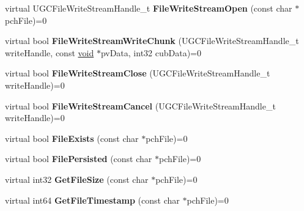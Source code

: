 \begin{DoxyCompactItemize}
\item 
\hypertarget{classISteamRemoteStorage_aa88184d6151848c3bfb2f2cc4edda106}{}virtual U\+G\+C\+File\+Write\+Stream\+Handle\+\_\+t {\bfseries File\+Write\+Stream\+Open} (const char $\ast$pch\+File)=0\label{classISteamRemoteStorage_aa88184d6151848c3bfb2f2cc4edda106}

\item 
\hypertarget{classISteamRemoteStorage_a6e4df6a98b25df3f53a138308d0ef4c8}{}virtual bool {\bfseries File\+Write\+Stream\+Write\+Chunk} (U\+G\+C\+File\+Write\+Stream\+Handle\+\_\+t write\+Handle, const \hyperlink{SDL__audio_8h_a52835ae37c4bb905b903cbaf5d04b05f}{void} $\ast$pv\+Data, int32 cub\+Data)=0\label{classISteamRemoteStorage_a6e4df6a98b25df3f53a138308d0ef4c8}

\item 
\hypertarget{classISteamRemoteStorage_a75cb2ddfcb360125c09ed0ae6a29ccd7}{}virtual bool {\bfseries File\+Write\+Stream\+Close} (U\+G\+C\+File\+Write\+Stream\+Handle\+\_\+t write\+Handle)=0\label{classISteamRemoteStorage_a75cb2ddfcb360125c09ed0ae6a29ccd7}

\item 
\hypertarget{classISteamRemoteStorage_a94792c03e24373354c2923d727a8dc9d}{}virtual bool {\bfseries File\+Write\+Stream\+Cancel} (U\+G\+C\+File\+Write\+Stream\+Handle\+\_\+t write\+Handle)=0\label{classISteamRemoteStorage_a94792c03e24373354c2923d727a8dc9d}

\item 
\hypertarget{classISteamRemoteStorage_a78c9e7b692b4d45e927357cfc050af5b}{}virtual bool {\bfseries File\+Exists} (const char $\ast$pch\+File)=0\label{classISteamRemoteStorage_a78c9e7b692b4d45e927357cfc050af5b}

\item 
\hypertarget{classISteamRemoteStorage_a548e3c0cc219c178ad1650e72e114983}{}virtual bool {\bfseries File\+Persisted} (const char $\ast$pch\+File)=0\label{classISteamRemoteStorage_a548e3c0cc219c178ad1650e72e114983}

\item 
\hypertarget{classISteamRemoteStorage_adad41e06f8b67adc4a3771f6ed56d0db}{}virtual int32 {\bfseries Get\+File\+Size} (const char $\ast$pch\+File)=0\label{classISteamRemoteStorage_adad41e06f8b67adc4a3771f6ed56d0db}

\item 
\hypertarget{classISteamRemoteStorage_abaf3071addc3f08c7e360544b90d4292}{}virtual int64 {\bfseries Get\+File\+Timestamp} (const char $\ast$pch\+File)=0\label{classISteamRemoteStorage_abaf3071addc3f08c7e360544b90d4292}


\end{DoxyCompactItemize}
